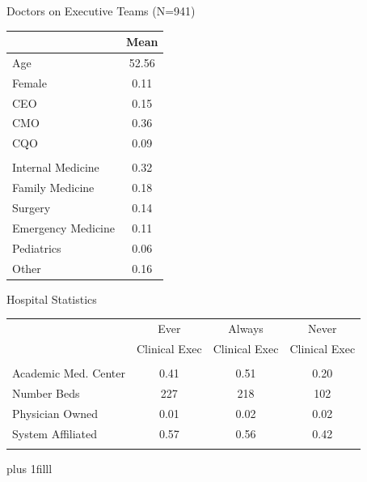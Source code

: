 \documentclass[notes,11pt, aspectratio=169]{beamer}
\newcommand{\btVFill}{\vskip0pt plus 1filll}
\begin{document}
\begin{frame}{Doctors on Executive Teams (N=941)}\large
\begin{table}[ht!]
\centering
\begin{tabular}[t]{lc}
\toprule
& Mean\\
\midrule
Age & 52.56\\
Female & 0.11\\
CEO & 0.15\\
CMO & 0.36\\
CQO & 0.09\\
\addlinespace[0.3em]
\multicolumn{2}{l}{\textbf{Specialty}}\\
\hspace{1em}Internal Medicine & 0.32\\
\hspace{1em}Family Medicine & 0.18\\
\hspace{1em}Surgery & 0.14\\
\hspace{1em}Emergency Medicine \hspace{4mm} & 0.11\\
\hspace{1em}Pediatrics & 0.06\\
\hspace{1em}Other & 0.16\\
\bottomrule
\end{tabular}
\end{table}
\end{frame}


\begin{frame}{Hospital Statistics}\label{sumstats}\large
\vspace{10mm}
\begin{table}[ht!]
\centering
\begin{tabular}[t]{lccc}
\midrule
 & Ever & Always & Never\\
  & Clinical Exec &Clinical Exec &Clinical Exec\\
\midrule
\addlinespace[0.3em]
\multicolumn{4}{l}{\textbf{Hospital Characteristics}}\\
\hspace{1em}Academic Med. Center & 0.41 & 0.51 & 0.20\\
\hspace{1em}Number Beds & 227 & 218 & 102\\
\hspace{1em}Physician Owned & 0.01 & 0.02 & 0.02\\
\hspace{1em}System Affiliated & 0.57 & 0.56 & 0.42\\
\addlinespace[0.3em]
\bottomrule
\end{tabular}
\end{table}
\btVFill
\hyperlink{forprofitstats}{}
\end{frame}
\end{document}
